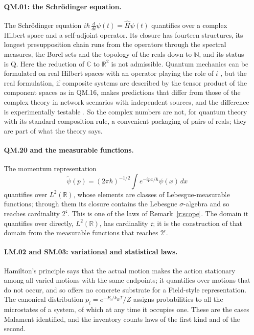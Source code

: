 \documentclass{situationist-preprint}
\begin{document}
\paragraph{QM.01: the Schr\"odinger equation.} The Schr\"odinger equation $i\hbar\,\frac{d}{dt}\psi(t) = \hat H\psi(t)$ quantifies over a complex Hilbert space and a self-adjoint operator. Its closure has fourteen structures, its longest presupposition chain runs from the operators through the spectral measures, the Borel sets and the topology of the reals down to $\mathbb N$, and its status is Q. Here the reduction of $\mathbb C$ to $\mathbb R^2$ is not admissible. Quantum mechanics can be formulated on real Hilbert spaces with an operator playing the role of $i$ \citep{Stueckelberg1960}, but the real formulation, if composite systems are described by the tensor product of the component spaces as in QM.16, makes predictions that differ from those of the complex theory in network scenarios with independent sources, and the difference is experimentally testable \citep{Renou2021}. So the complex numbers are not, for quantum theory with its standard composition rule, a convenient packaging of pairs of reals; they are part of what the theory says.

\paragraph{QM.20 and the measurable functions.} The momentum representation\[\tilde\psi(p) = (2\pi\hbar)^{-1/2}\int e^{-ipx/\hbar}\psi(x)\,dx\]quantifies over $L^2(\mathbb R)$, whose elements are classes of Lebesgue-measurable functions; through them its closure contains the Lebesgue $\sigma$-algebra and so reaches cardinality $2^{\mathfrak c}$. This is one of the \nClosTwoC{} laws of Remark~\ref{r:scope}. The domain it quantifies over directly, $L^2(\mathbb R)$, has cardinality $\mathfrak c$; it is the construction of that domain from the measurable functions that reaches $2^{\mathfrak c}$.

\paragraph{LM.02 and SM.03: variational and statistical laws.} Hamilton's principle says that the actual motion makes the action stationary among all varied motions with the same endpoints; it quantifies over motions that do not occur, and so offers no concrete substrate for a Field-style representation. The canonical distribution $p_i = e^{-E_i/k_BT}/Z$ assigns probabilities to all the microstates of a system, of which at any time it occupies one. These are the cases Malament identified, and the inventory counts \nStatV{} laws of the first kind and \nStatP{} of the second.
\end{document}

